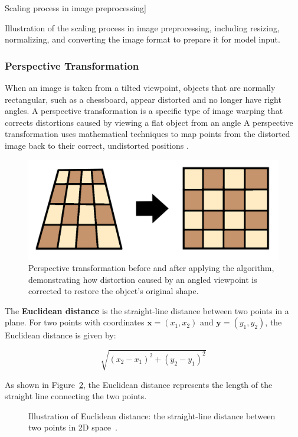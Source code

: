 Scaling process in image preprocessing]{Illustration of the scaling process in image preprocessing, including resizing, normalizing, and converting the image format to prepare it for model input.

\subsubsection*{Perspective Transformation}

When an image is taken from a tilted viewpoint, objects that are normally rectangular, such as a chessboard, appear distorted and no longer have right angles. A perspective transformation is a specific type of image warping that corrects distortions caused by viewing a flat object from an angle A perspective transformation uses mathematical techniques to map points from the distorted image back to their correct, undistorted positions \cite{nvidia:perspective-transform}.


\begin{figure}[h!]
    \centering
    \includegraphics[width=0.75\linewidth]{figures/theory/image-recognition/perspective-transformation.png}
    \caption[Perspective transformation before and after]{Perspective transformation before and after applying the algorithm, demonstrating how distortion caused by an angled viewpoint is corrected to restore the object’s original shape.}
    \label{fig:perspective-transformation}
\end{figure}





The \textbf{Euclidean distance} is the straight-line distance between two points in a plane. For two points with coordinates $\mathbf{x} = (x_1, x_2)$ and $\mathbf{y} = (y_1, y_2)$, the Euclidean distance is given by:

\[
\sqrt{(x_2 - x_1)^2 + (y_2 - y_1)^2}
\]

As shown in Figure~\ref{fig:euclidean-distance}, the Euclidean distance represents the length of the straight line connecting the two points.

\begin{figure}[h!]
    \centering
    \caption{Illustration of Euclidean distance: the straight-line distance between two points in 2D space~\cite{geeksforgeeks:euclidean-distance}.}
    \label{fig:euclidean-distance}
\end{figure}




}
